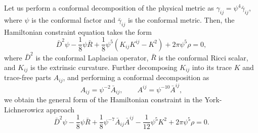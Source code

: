 Let us perform a conformal decomposition of the physical metric as
$\gamma_{ij}=\psi^4\bar{\gamma}_{ij}$,
where $\psi$ is the conformal factor and $\bar{\gamma}_{ij}$ is the conformal metric.
Then, the Hamiltonian constraint equation takes the form
\begin{equation}
    \bar{D}^2 \psi - \frac{1}{8} \psi \bar{R}
    + \frac{1}{8} \psi^5 (K_{ij}K^{ij} - K^2 )
    + 2\pi\psi^5 \rho = 0,
\end{equation}
where $\bar{D}^2$ is the conformal Laplacian operator,
$\bar{R}$ is the conformal Ricci scalar, and $K_{ij}$ is the extrinsic curvature.
Further decomposing $K_{ij}$ into its trace $K$ and trace-free parts $A_{ij}$,
and performing a conformal decomposition as
\begin{equation}
    A_{ij} = \psi^{-2}\bar{A}_{ij},
    \quad \quad
    A^{ij} = \psi^{-10}\bar{A}^{ij},
\end{equation}
we obtain the general form of the Hamiltonian constraint in the York-Lichnerowicz approach
\begin{equation}
    \bar{D}^2 \psi
    - \frac{1}{8} \psi \bar{R}
    + \frac{1}{8} \psi^{-7} \bar{A}_{ij}\bar{A}^{ij}
    - \frac{1}{12} \psi^5 K^2
    + 2\pi\psi^5 \rho = 0.
\end{equation}



